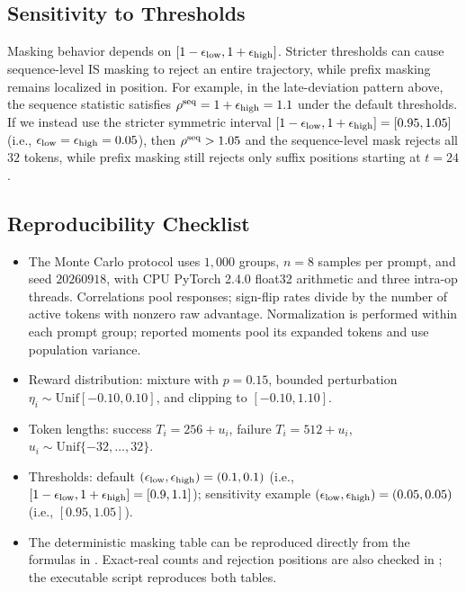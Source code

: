 \subsection{Sensitivity to Thresholds}

Masking behavior depends on $[1-\epsilon_{\mathrm{low}},1+\epsilon_{\mathrm{high}}]$. Stricter thresholds can cause sequence-level IS masking to reject an entire trajectory,
while prefix masking remains localized in position. For example, in the late-deviation pattern above, the sequence statistic satisfies
$\rho^{\mathrm{seq}}=1+\epsilon_{\mathrm{high}}=1.1$ under the default thresholds. If we instead use the stricter symmetric interval $[1-\epsilon_{\mathrm{low}},1+\epsilon_{\mathrm{high}}]=[0.95,1.05]$
(i.e., $\epsilon_{\mathrm{low}}=\epsilon_{\mathrm{high}}=0.05$), then $\rho^{\mathrm{seq}}>1.05$ and the sequence-level mask rejects all $32$ tokens, while prefix masking still rejects only
suffix positions starting at $t=24$.

\subsection{Reproducibility Checklist}

\begin{itemize}
    \item The Monte Carlo protocol uses $1{,}000$ groups, $n=8$ samples per prompt, and seed $20260918$, with CPU PyTorch 2.4.0 float32 arithmetic and three intra-op threads. Correlations pool responses; sign-flip rates divide by the number of active tokens with nonzero raw advantage. Normalization is performed within each prompt group; reported moments pool its expanded tokens and use population variance.
    \item Reward distribution: mixture with $p=0.15$, bounded perturbation $\eta_i\sim\mathrm{Unif}[-0.10,0.10]$, and clipping to $[-0.10,1.10]$.
    \item Token lengths: success $T_i = 256 + u_i$, failure $T_i = 512 + u_i$, $u_i \sim \mathrm{Unif}\{-32,\ldots,32\}$.
    \item Thresholds: default $(\epsilon_{\mathrm{low}},\epsilon_{\mathrm{high}})=(0.1,0.1)$ (i.e., $[1-\epsilon_{\mathrm{low}},1+\epsilon_{\mathrm{high}}]=[0.9,1.1]$); sensitivity example $(\epsilon_{\mathrm{low}},\epsilon_{\mathrm{high}})=(0.05,0.05)$ (i.e., $[0.95,1.05]$).
    \item The deterministic masking table can be reproduced directly from the formulas in
    . Exact-real counts and rejection positions are also checked in
    ; the executable script reproduces both tables.
\end{itemize}
